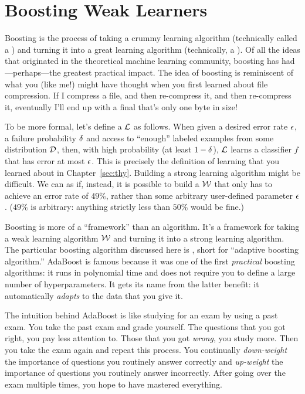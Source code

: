 \section{Boosting Weak Learners}

Boosting is the process of taking a crummy learning algorithm
(technically called a ) and turning it into a
great learning algorithm (technically, a ).
Of all the ideas that originated in the theoretical machine learning
community, boosting has had---perhaps---the greatest practical impact.
The idea of boosting is reminiscent of what you (like me!)  might have
thought when you first learned about file compression.  If I compress
a file, and then re-compress it, and then re-compress it, eventually
I'll end up with a final that's only one byte in size!

To be more formal, let's define a 
$\mathcal{L}$ as follows.  When given a desired error rate $\epsilon$, a failure
probability $\delta$ and access to ``enough'' labeled examples from some
distribution $\mathcal{D}$, then, with high probability (at least $1-\delta$),
$\mathcal{L}$ learns a classifier $f$ that has error at most $\epsilon$.  This is
precisely the definition of  learning that you learned
about in Chapter~\ref{sec:thy}.  Building a strong learning algorithm
might be difficult.  We can as if, instead, it is possible to build a
 $\mathcal{W}$ that only has to achieve an
error rate of $49\%$, rather than some arbitrary user-defined
parameter $\epsilon$.  ($49\%$ is arbitrary: anything strictly less than
$50\%$ would be fine.)

Boosting is more of a ``framework'' than an algorithm.  It's a
framework for taking a weak learning algorithm $\mathcal{W}$ and turning it
into a strong learning algorithm.  The particular boosting algorithm
discussed here is , short for ``adaptive boosting
algorithm.''  AdaBoost is famous because it was one of the first
\emph{practical} boosting algorithms: it runs in polynomial time and
does not require you to define a large number of hyperparameters.  It
gets its name from the latter benefit: it automatically \emph{adapts}
to the data that you give it.

The intuition behind AdaBoost is like studying for an exam by using
a past exam.  You take the past exam and grade yourself.  The
questions that you got right, you pay less attention to.  Those that
you got \emph{wrong}, you study more.  Then you take the exam again
and repeat this process.  You continually \emph{down-weight} the
importance of questions you routinely answer correctly and
\emph{up-weight} the importance of questions you routinely answer
incorrectly.  After going over the exam multiple times, you hope to
have mastered everything.

